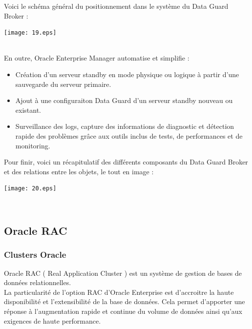 \documentclass[12pt]{report}
\begin{document}
\vspace{1cm}

Voici le schéma général du positionnement dans le système du Data Guard Broker :
\\

\begin{center}
  \texttt{[image: 19.eps]}
\end{center}\\

En outre, Oracle Enterprise Manager automatise et simplifie :

\begin{itemize}
\item Création d'un serveur standby en mode physique ou logique à partir d'une
sauvegarde du serveur primaire.

\item Ajout à une configuraiton Data Guard d'un serveur standby nouveau ou
  existant.

\item Surveillance des logs, capture des informations de diagnostic et détection
rapide des problèmes grâce aux outils inclus de tests, de performances et de
monitoring.
\end{itemize}
\vspace{1cm}

Pour finir, voici un récapitulatif des différents composants du Data Guard
Broker et des relations entre les objets, le tout en image :

\begin{center}
  \texttt{[image: 20.eps]}
\end{center}\\

\subsection{Oracle RAC}

\subsubsection{Clusters Oracle}

Oracle RAC ( Real Application Cluster ) est un système de gestion de bases de
données relationnelles. \\

La particularité de l’option RAC d’Oracle Enterprise est d’accroitre la haute
disponibilité et l’extensibilité de la base de données. Cela permet d’apporter
une réponse à l’augmentation rapide et continue du volume de données ainsi
qu’aux exigences de haute performance. \\
\end{document}
